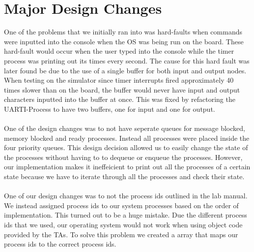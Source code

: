 \documentclass[12pt]{article}
\begin{document}
\section{Major Design Changes}
One of the problems that we initially ran into was hard-faults when commands were inputted into the console when the OS was being run on the board. These hard-fault would occur when the user typed into the console while the timer process was printing out its times every second. The cause for this hard fault was later found be due to the use of a single buffer for both input and output nodes. When testing on the simulator since timer interrupts fired approximately 40 times slower than on the board, the buffer would never have input and output characters inputted into the buffer at once. This was fixed by refactoring the UARTI-Process to have two buffers, one for input and one for output. \\ \\
One of the design changes was to not have seperate queues for message blocked, memory blocked and ready processes. Instead all processes were placed inside the four priority queues. This design decision allowed us to easily change the state of the  processes without having to to dequeue or enqueue the processes. However, our implementation makes it ineffeicient to print out all the processes of a certain state because we have to iterate through all the processes and check their state.\\ \\
One of our design changes was to not the process ids outlined in the lab manual. We instead assigned process ids to our system processes based on the order of implementation. This turned out to be a huge mistake. Due the different process ids that we used, our operating system would not work when using object code provided by the TAs. To solve this problem we created a array that maps our process ids to the correct process ids. \\ \\
\end{document}
